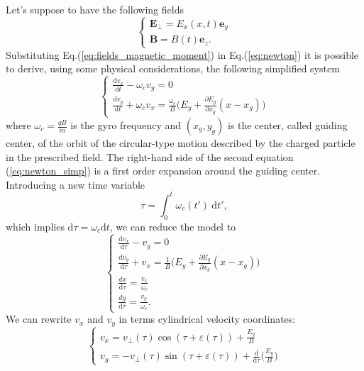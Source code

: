 Let's suppose to have the following fields
\begin{equation}\label{eq:fields_magnetic_moment}
  \begin{cases}
    \mathbf{E}_{\perp}=E_x(x,t)\mathbf{e}_y\\
    \mathbf{B}=B(t)\mathbf{e}_z.
  \end{cases}
\end{equation}
Substituting Eq.(\ref{eq:fields_magnetic_moment}) in Eq.(\ref{eq:newton}) it is possible to derive, using some physical considerations, the following simplified system
\begin{equation}\label{eq:newton_simp}
  \begin{cases}
    \frac{\mathrm{d}v_x}{\mathrm{d}t}-\omega_cv_y=0\\
    \frac{\mathrm{d}v_y}{\mathrm{d}t}+\omega_cv_x=\frac{\omega_c}{B}\big(E_y+\frac{\partial E_y}{\partial x_g}(x-x_g)\big)
  \end{cases}
\end{equation}
where $\omega_c=\frac{qB}{m}$ is the gyro frequency and $(x_g,y_g)$ is the center, called guiding center, of the orbit of the circular-type motion described by the charged particle in the prescribed field. The right-hand side of the second equation (\ref{eq:newton_simp}) is a first order expansion around the guiding center. Introducing a new time variable
\begin{equation}
  \tau=\int_0^t\omega_c(t')\:\mathrm{d}t',
\end{equation}
which implies $\mathrm{d}\tau=\omega_c\mathrm{d}t$, we can reduce the model to
\begin{equation}\label{eq:newton_simp_bis}
  \begin{cases}
    \frac{\mathrm{d}v_x}{\mathrm{d}\tau}-v_y=0\\
    \frac{\mathrm{d}v_y}{\mathrm{d}\tau}+v_x=\frac{1}{B}\big(E_y+\frac{\partial E_y}{\partial x_g}(x-x_g)\big)\\
    \frac{{d}x}{\mathrm{d}\tau}=\frac{v_x}{\omega_c}\\
    \frac{{d}y}{\mathrm{d}\tau}=\frac{v_y}{\omega_c}.
  \end{cases}
\end{equation}
We can rewrite $v_x$ and $v_y$ in terms cylindrical velocity coordinates:
\begin{equation}\label{eq:cylindrical_velocities}
  \begin{cases}
    v_x=v_{\perp}(\tau)\cos(\tau+\varepsilon(\tau))+\frac{E_y}{B}\\
    v_y=-v_{\perp}(\tau)\sin(\tau+\varepsilon(\tau))+\frac{\mathrm{d}}{\mathrm{d}\tau}\big(\frac{E_y}{B}\big)
  \end{cases}
\end{equation}
